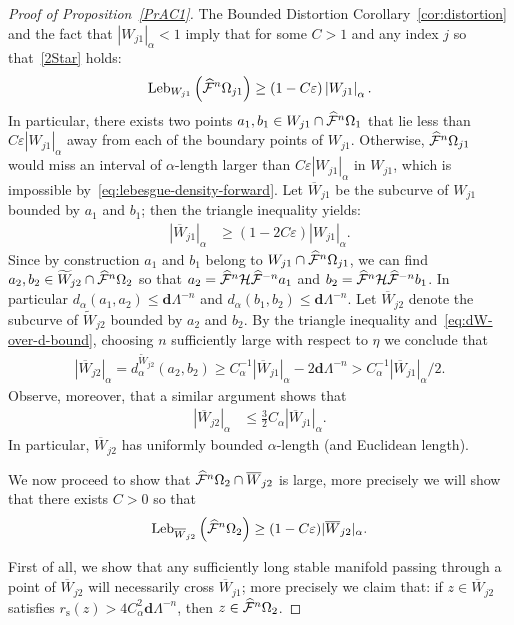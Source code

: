 \documentclass[AHL, Unicode, longabstracts,published]{cedram}
\newcommand{\eps}{\varepsilon}
\newcommand{\stable}{\text{s}}
\newcommand{\bd}{\mathbf{d}}
\newcommand{\cm}{\mathcal{F}}
\newcommand{\hol}{\mathcal{H}}
\newcommand{\cmp}{\hat\cm}
\newcommand{\brW}{\overline{W}}
\newcommand{\tW}{\widetilde{W}}
\newcommand{\dadm}[1]{\dadmPrivate^{#1}}
\newcommand{\dadmPrivate}{d\adm}
\newcommand{\rs}{r_{\stable}}
\newcommand{\adm}{_{\alpha^{+}}}
\newcommand{\admName}{\alpha^{+}}
\newcommand{\Leb}{\textup{Leb}}
\renewcommand{\admName}{\alpha}
\renewcommand{\adm}{_{\alpha}}
\renewcommand{\dadm}{d\adm}
\let\oldhat\hat
\renewcommand*{\hat}[1]{\mathchoice{\widehat{#1}}{\widehat{#1}}{\oldhat{#1}}{\oldhat{#1}}}
\begin{document}
\begin{proof}[Proof of Proposition~\ref{PrAC1}]
The Bounded Distortion Corollary~\ref{cor:distortion} and the fact that $|W_{j1}|\adm < 1$ imply that for some $C > 1$ and any index $j$ so that~\eqref{2Star} holds:
\begin{align}\label{eq:lebesgue-density-forward}
\Leb_{W_{j1}}\left(\cmp^{n}\Omega_{j1}\right)\ge (1-C\eps)\left|W_{j1}\right|\adm.
\end{align}
In particular, there exists two points $a_{1},b_{1}\in W_{j1}\cap\cmp^{n}\Omega_{1}$ that lie less than $C\eps |W_{j1}|\adm$ away from each of the boundary points of $W_{j1}$. Otherwise, $\cmp^{n}\Omega_{j1}$ would miss an interval of $\admName$-length larger than $C\eps|W_{j1}|\adm$ in $W_{j1}$, which is impossible by~\eqref{eq:lebesgue-density-forward}. Let $\brW_{j1}$ be the subcurve of $W_{j1}$ bounded by $a_{1}$ and $b_{1}$; then the triangle inequality yields:
\begin{align}\label{eq:bar-w1j-length}
|\brW_{j1}|\adm &\ge (1-2C\eps)|W_{j1}|\adm.
\end{align}
Since by construction $a_{1}$ and $b_{1}$ belong to $W_{j1}\cap\cmp^{n}\Omega_{j1}$, we can find $a_{2}, b_{2}\in\tW_{j2}\cap\cmp^{n}\Omega_{2}$ so that $a_{2} = \cmp^{n}\hol\cmp^{-n}a_{1}$ and $b_{2} = \cmp^{n}\hol\cmp^{-n}b_{1}$. In particular $\dadm(a_{1},a_{2})\le \bd\Lambda^{-n}$ and $\dadm(b_{1},b_{2})\le \bd\Lambda^{-n}$. Let $\brW_{j2}$ denote the subcurve of $\tW_{j2}$ bounded by $a_{2}$ and $b_{2}$. By the triangle inequality and~\eqref{eq:dW-over-d-bound}, choosing $n$ sufficiently large with respect to $\eta$ we conclude that
\begin{align}\label{eq:Wj1-eta}
|\brW_{j2}|\adm = \dadm^{\tW_{j2}}(a_{2},b_{2})\ge C_{\alpha}^{-1}|\brW_{j1}|\adm-2\bd\Lambda^{-n} > C_{\alpha}^{-1}|\brW_{j1}|_{\alpha}/2.
\end{align}
Observe, moreover, that a similar argument shows that
\begin{align*}
|\brW_{j2}|\adm&\le\frac32C_{\alpha}|\brW_{j1}|\adm.
\end{align*}
In particular, $\brW_{j2}$ has uniformly bounded $\admName$-length (and Euclidean length).

We now proceed to show that $\cmp^{n}\Omega_{2}\cap \brW_{j2}$ is large, more precisely we will show that there exists $C > 0$ so that
\begin{align}\label{W2-Omega2}
\Leb_{\brW_{j2}}\left(\cmp^{n}\Omega_{2}\right)\ge (1-C\eps)|\brW_{j2}|\adm.
\end{align}

First of all, we show that any sufficiently long stable manifold passing through a point of $\brW_{j2}$ will necessarily cross $\brW_{j1}$; more precisely we claim that: if $z\in\brW_{j2}$ satisfies $\rs(z) >4 C^{2}_{\admName}\bd\Lambda^{-n}$, then $z\in\cmp^{n}\Omega_{2}$.


\end{proof}
\end{document}
